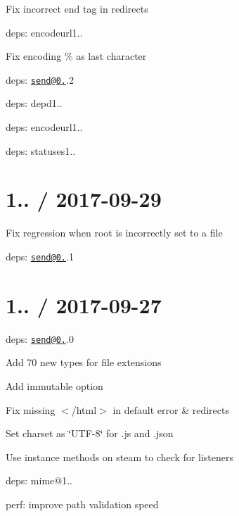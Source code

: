 
\begin{DoxyItemize}
\item Fix incorrect end tag in redirects
\item deps\+: encodeurl1..
\begin{DoxyItemize}
\item Fix encoding {\ttfamily \%} as last character
\end{DoxyItemize}
\item deps\+: \href{mailto:send@0.16}{\tt send@0.}.2
\begin{DoxyItemize}
\item deps\+: depd1..
\item deps\+: encodeurl1..
\item deps\+: statuses1..
\end{DoxyItemize}
\end{DoxyItemize}

\section*{1.. / 2017-\/09-\/29 }


\begin{DoxyItemize}
\item Fix regression when {\ttfamily root} is incorrectly set to a file
\item deps\+: \href{mailto:send@0.16}{\tt send@0.}.1
\end{DoxyItemize}

\section*{1.. / 2017-\/09-\/27 }


\begin{DoxyItemize}
\item deps\+: \href{mailto:send@0.16}{\tt send@0.}.0
\begin{DoxyItemize}
\item Add 70 new types for file extensions
\item Add {\ttfamily immutable} option
\item Fix missing {\ttfamily $<$/html$>$} in default error \& redirects
\item Set charset as \char`\"{}\+U\+T\+F-\/8\char`\"{} for .js and .json
\item Use instance methods on steam to check for listeners
\item deps\+: mime@1..
\item perf\+: improve path validation speed
\end{DoxyItemize}
\end{DoxyItemize}

